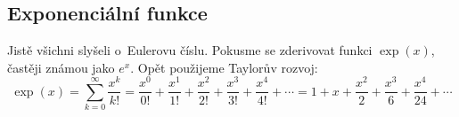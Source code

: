 \subsection{Exponenciální funkce}

Jistě všichni slyšeli o~Eulerovu číslu. Pokusme se zderivovat funkci $\exp(x)$, častěji známou jako $e^x$. Opět použijeme Taylorův rozvoj:
\begin{equation*}
    \exp(x) = \sum_{k=0}^{\infty} \frac{x^k}{k!}
    = \frac{x^0}{0!} + \frac{x^1}{1!} + \frac{x^2}{2!} + \frac{x^3}{3!} + \frac{x^4}{4!} + \cdots
    = 1 + x + \frac{x^2}{2} + \frac{x^3}{6} + \frac{x^4}{24} + \cdots
\end{equation*}
